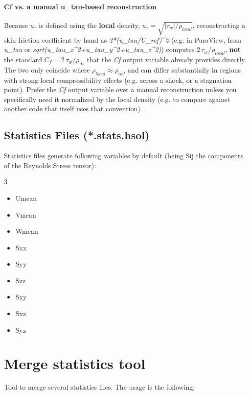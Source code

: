 \documentclass[a4paper,10pt]{report}
\begin{document}
\paragraph{Cf vs. a manual u\_tau-based reconstruction}

Because $u_\tau$ is defined using the \textbf{local} density, $u_\tau=\sqrt{|\tau_w|/\rho_{local}}$, reconstructing a skin friction coefficient by hand as \textit{2*(u\_tau/U\_ref)\textasciicircum2} (e.g. in ParaView, from \textit{u\_tau} or \textit{sqrt(u\_tau\_x\textasciicircum2+u\_tau\_y\textasciicircum2+u\_tau\_z\textasciicircum2)}) computes $2\,\tau_w/\rho_{local}$, \textbf{not} the standard $C_f = 2\,\tau_w/\rho_\infty$ that the \textit{Cf} output variable already provides directly. The two only coincide where $\rho_{local}\approx\rho_\infty$, and can differ substantially in regions with strong local compressibility effects (e.g. across a shock, or a stagnation point). Prefer the \textit{Cf} output variable over a manual reconstruction unless you specifically need it normalized by the local density (e.g. to compare against another code that itself uses that convention).

\subsection{Statistics Files (*.stats.hsol)}
Statistics files generate following variables by default (being Sij the components of the Reynolds Stress tensor):

\begin{multicols}{3}
\begin{itemize}
\item Umean
\item Vmean
\item Wmean
\item Sxx
\item Syy
\item Szz
\item Sxy
\item Sxz
\item Syz
\end{itemize}
\end{multicols}

\section{Merge statistics tool}

Tool to merge several statistics files. The usage is the following:
\end{document}
